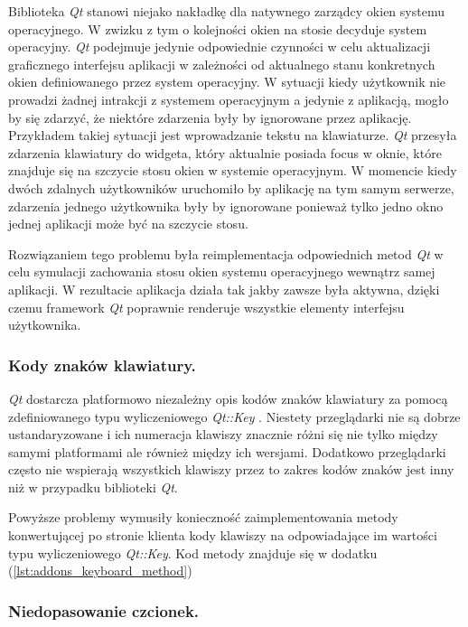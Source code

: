Biblioteka \emph{Qt} stanowi niejako nakładkę dla natywnego zarządcy okien systemu operacyjnego. W zwizku z tym o kolejności okien na stosie decyduje system operacyjny. \emph{Qt} podejmuje jedynie odpowiednie czynności w celu aktualizacji graficznego interfejsu aplikacji w zależności od aktualnego stanu konkretnych okien definiowanego przez system operacyjny. W sytuacji kiedy użytkownik nie prowadzi żadnej intrakcji z systemem operacyjnym a jedynie z aplikacją, mogło by się zdarzyć, że niektóre zdarzenia były by ignorowane przez aplikację. Przykładem takiej sytuacji jest wprowadzanie tekstu na klawiaturze. \emph{Qt} przesyła zdarzenia klawiatury do widgeta, który aktualnie posiada focus w oknie, które znajduje się na szczycie stosu okien w systemie operacyjnym. W momencie kiedy dwóch zdalnych użytkowników uruchomiło by aplikację na tym samym serwerze, zdarzenia jednego użytkownika były by ignorowane ponieważ tylko jedno okno jednej aplikacji może być na szczycie stosu. 

Rozwiązaniem tego problemu była reimplementacja odpowiednich metod \emph{Qt} w celu symulacji zachowania stosu okien systemu operacyjnego wewnątrz samej aplikacji. W rezultacie aplikacja działa tak jakby zawsze była aktywna, dzięki czemu framework \emph{Qt} poprawnie renderuje wszystkie elementy interfejsu użytkownika.

\subsubsection{Kody znaków klawiatury.}
\label{problems_keyboard}

\emph{Qt} dostarcza platformowo niezależny opis kodów znaków klawiatury za pomocą zdefiniowanego typu wyliczeniowego \emph{Qt::Key }\cite{qtkey}. Niestety przeglądarki nie są dobrze ustandaryzowane i ich numeracja klawiszy znacznie różni się nie tylko między samymi platformami ale również między ich wersjami. Dodatkowo przeglądarki często nie wspierają wszystkich klawiszy przez to zakres kodów znaków jest inny niż w przypadku biblioteki \emph{Qt}.

Powyższe problemy wymusiły konieczność zaimplementowania metody konwertującej po stronie klienta kody klawiszy na odpowiadające im wartości typu wyliczeniowego \emph{Qt::Key}. Kod metody znajduje się w dodatku (\ref{lst:addons_keyboard_method})

\subsubsection{Niedopasowanie czcionek.}
\label{problems_fonts}

